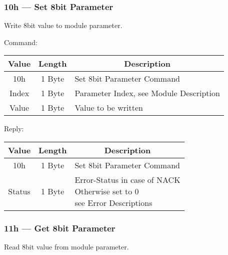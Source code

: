 \subsubsection{10h --- Set 8bit Parameter}
Write 8bit value to module parameter. 

Command:
\begin{table}[H]
    \centering
    \begin{tabular}{|c|c|l|}
        \hline
        \textbf{Value}   &   \textbf{Length} & \multicolumn{1}{|c|}{\textbf{Description}}\\ \hline \hline
        10h   &  1 Byte & Set 8bit Parameter Command \\ \hline
        Index & 1 Byte  & Parameter Index, see Module Description \\ \hline
        Value & 1 Byte & Value to be written\\ \hline
    \end{tabular}
\label{tab:CAN-10-C}
\end{table}
Reply:
\begin{table}[H]
    \centering
    \begin{tabular}{|c|c|l|}
        \hline
        \textbf{Value}   &   \textbf{Length} & \multicolumn{1}{|c|}{\textbf{Description}}\\ \hline \hline
        10h   &  1 Byte & Set 8bit Parameter Command \\ \hline
        Status & 1 Byte & \makecell[l]{Error-Status in case of NACK \\ Otherwise set to 0\\see Error Descriptions}\\ \hline
    \end{tabular}
\label{tab:CAN-10-R}
\end{table}

\subsubsection{11h --- Get 8bit Parameter}
Read 8bit value from module parameter.

